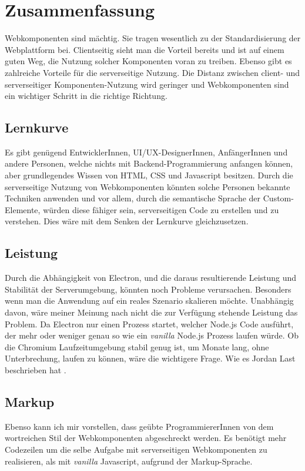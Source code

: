 \chapter{Zusammenfassung}
Webkomponenten sind mächtig. Sie tragen wesentlich zu der Standardisierung der Webplattform bei. Clientseitig sieht man die Vorteil bereits und ist auf einem guten Weg, die Nutzung solcher Komponenten voran zu treiben. Ebenso gibt es zahlreiche Vorteile für die serverseitige Nutzung. Die Distanz zwischen client- und serverseitiger Komponenten-Nutzung wird geringer und Webkomponenten sind ein wichtiger Schritt in die richtige Richtung.

\section{Lernkurve}
Es gibt genügend EntwicklerInnen, UI/UX-DesignerInnen, AnfängerInnen und andere Personen, welche nichts mit Backend-Programmierung anfangen können, aber grundlegendes Wissen von HTML, CSS und Javascript besitzen. Durch die serverseitige Nutzung von Webkomponenten könnten solche Personen bekannte Techniken anwenden und vor allem, durch die semantische Sprache der Custom-Elemente, würden diese fähiger sein, serverseitigen Code zu erstellen und zu verstehen. Dies wäre mit dem Senken der Lernkurve gleichzusetzen.

\section{Leistung}
Durch die Abhängigkeit von Electron, und die daraus resultierende Leistung und Stabilität der Serverumgebung, könnten noch Probleme verursachen. Besonders wenn man die Anwendung auf ein reales Szenario skalieren möchte. Unabhängig davon, wäre meiner Meinung nach nicht die zur Verfügung stehende Leistung das Problem. Da Electron nur einen Prozess startet, welcher Node.js Code ausführt, der mehr oder weniger genau so wie ein \textit{vanilla} Node.js Prozess laufen würde. Ob die Chromium Laufzeitumgebung stabil genug ist, um Monate lang, ohne Unterbrechung, laufen zu können, wäre die wichtigere Frage. Wie es Jordan Last beschrieben hat \cite{server-side-webcomponents}.

\section{Markup}
Ebenso kann ich mir vorstellen, dass geübte ProgrammiererInnen von dem wortreichen Stil der Webkomponenten abgeschreckt werden. Es benötigt mehr Codezeilen um die selbe Aufgabe mit serverseitigen Webkomponenten zu realisieren, als mit \textit{vanilla} Javascript, aufgrund der Markup-Sprache.


